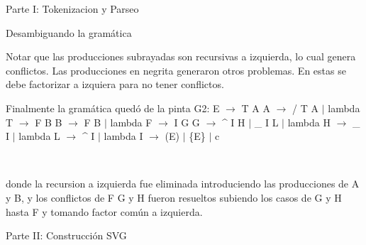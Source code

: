 \begin{section}{Parte I: Tokenizacion y Parseo}
\begin{subsection}{Desambiguando la gram\'atica}
~

Notar que las producciones subrayadas son recursivas a izquierda, lo cual genera conflictos. 
Las producciones en negrita generaron otros problemas. En estas se debe factorizar a izquiera para no tener conflictos.

Finalmente la gram\'atica qued\'o de la pinta G2:
\newline E $\rightarrow$ T A
\newline A $\rightarrow$ / T A $|$ lambda
\newline T $\rightarrow$ F B
\newline B $\rightarrow$ F B $|$ lambda
\newline F $\rightarrow$ I G
\newline G $\rightarrow$ \^{} I H $|$ \_ I L $|$ lambda
\newline H $\rightarrow$ \_ I $|$ lambda
\newline L $\rightarrow$ \^{} I $|$ lambda
\newline I $\rightarrow$ (E) $|$ \{E\} $|$ c
  
~

donde la recursion a izquierda fue eliminada introduciendo las producciones de A y B, y los conflictos de F G y H fueron resueltos subiendo los casos de G y H hasta F y tomando factor com\'un a izquierda.

\end{subsection}
\end{section}

\begin{section}{Parte II: Construcci\'on SVG}

\end{section}


